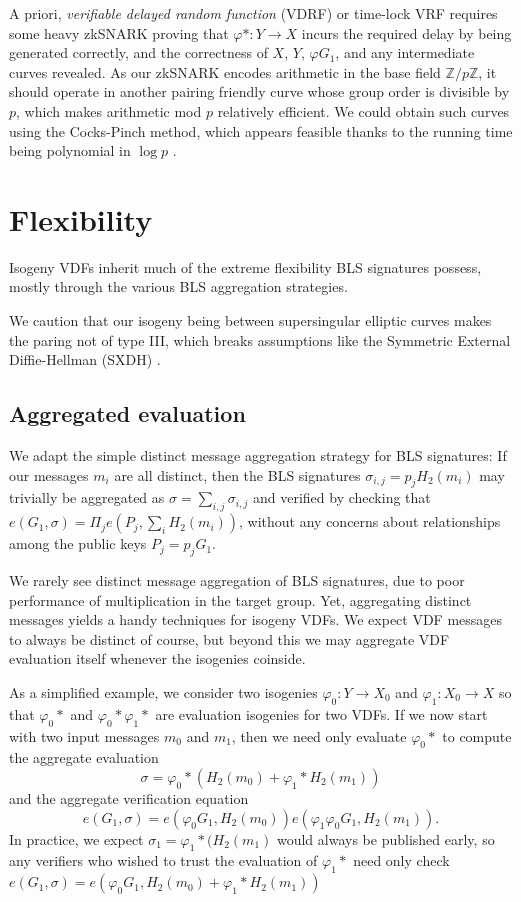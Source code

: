 \documentclass{article}
\newcommand{\Z}{\mathbb{Z}}
\newcommand\mathperiod{.}
\begin{document}
A priori, {\em verifiable delayed random function} (VDRF) or time-lock
VRF requires some heavy zkSNARK proving that $φ* : Y \to X$ incurs the
required delay by being generated correctly, and the correctness of
$X$, $Y$, $φ G_1$, and any intermediate curves revealed.  
As our zkSNARK encodes arithmetic in the base field $\Z/p\Z$,
it should operate in another pairing friendly curve whose group order
is divisible by $p$, which makes arithmetic mod $p$ relatively efficient.
We could obtain such curves using the Cocks-Pinch method, which appears
feasible thanks to the running time being polynomial in $\log p$ \cite{ordinary_cocks_pinch}.


\section{Flexibility}

Isogeny VDFs inherit much of the extreme flexibility BLS signatures
possess, mostly through the various BLS aggregation strategies.

We caution that our isogeny being between supersingular elliptic
curves makes the paring not of type III, which breaks assumptions
like the Symmetric External Diffie-Hellman (SXDH) \cite{ordinary_cocks_pinch}.

\subsection{Aggregated evaluation}

We adapt the simple distinct message aggregation strategy for
BLS signatures:  If our messages $m_i$ are all distinct, then the
BLS signatures $\sigma_{i,j} = p_j H_2(m_i)$ may trivially be
aggregated as $\sigma = \sum_{i,j} \sigma_{i,j}$ and verified by
checking that $e(G_1,\sigma) = \Pi_j e(P_j, \sum_i H_2(m_i))$,
without any concerns about relationships among the public keys
$P_j = p_j G_1$.  

We rarely see distinct message aggregation of BLS signatures, due to
poor performance of multiplication in the target group.  
Yet, aggregating distinct messages yields a handy techniques for
isogeny VDFs.  We expect VDF messages to always be distinct of course,
but beyond this we may aggregate VDF evaluation itself whenever the
isogenies coinside.

As a simplified example,
we consider two isogenies $φ_0 : Y \to X_0$ and $φ_1 : X_0 \to X$
so that $φ_0*$ and $φ_0* φ_1*$ are evaluation isogenies for  %
two VDFs.  If we now start with two input messages $m_0$ and $m_1$,
then we need only evaluate $φ_0*$ to compute the aggregate evaluation
$$ \sigma = φ_0*( H_2(m_0) + φ_1* H_2(m_1) )$$
and the aggregate verification equation
$$ e(G_1,\sigma) = e(φ_0 G_1, H_2(m_0)) e(φ_1 φ_0 G_1, H_2(m_1)) \mathperiod $$
In practice, we expect $\sigma_1 = φ_1*(H_2(m_1)$ would always be
published early, so any verifiers who wished to trust the evaluation
of $φ_1*$ need only check 
$e(G_1,\sigma) = e(φ_0 G_1, H_2(m_0) + φ_1* H_2(m_1))$
\end{document}
